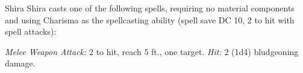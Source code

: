 \documentclass[10pt,a4paper,twoside,bg=print,twocolumn,openany,nodeprecatedcode]{dndbook}
\begin{document}
\begin{DndMonster}[float=t]{Shira}
\DndMonsterBasics[
armor-class = {10},
hit-points = {\DndDice{1d8}},
speed = {30 ft.}
]
\DndMonsterAbilityScores[
 str = 10,
 dex = 10,
 con = 10,
 int = 10,
 wis = 10,
 cha = 10
]
\DndMonsterDetails[
languages = {Any one language (usually Common)},
challenge = 0,
]
Shira casts one of the following spells, requiring no material components and using Charisma as the spellcasting ability (spell save DC 10, 2 to hit with spell attacks):
\begin{DndMonsterSpells}
\end{DndMonsterSpells}
\textsl{Melee Weapon Attack:} 2 to hit, reach 5 ft., one target. \textsl{Hit:} 2 (1d4) bludgeoning damage.

\end{DndMonster}
\end{document}
